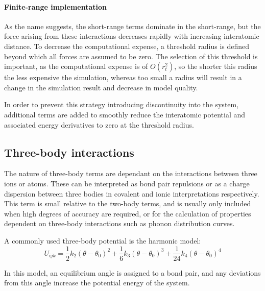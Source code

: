 \vspace{-5pt}
\paragraph{Finite-range implementation}
As the name suggests, the short-range terms dominate in the short-range, but the force arising from these interactions decreases rapidly with increasing interatomic distance.
To decrease the computational expense, a threshold radius is defined beyond which all forces are assumed to be zero.
The selection of this threshold is important, as the computational expense is of $O(r_t^2)$, so the shorter this radius the less expensive the simulation, whereas too small a radius will result in a change in the simulation result and decrease in model quality.

In order to prevent this strategy introducing discontinuity into the system, additional terms are added to smoothly reduce the interatomic potential and associated energy derivatives to zero at the threshold radius. %


\subsection{Three-body interactions}
The nature of three-body terms are dependant on the interactions between three ions or atoms.
These can be interpreted as bond pair repulsions or as a charge dispersion between three bodies in covalent and ionic interpretations respectively.
This term is small relative to the two-body terms, and is usually only included when high degrees of accuracy are required, or for the calculation of properties dependent on three-body interactions such as phonon distribution curves.

A commonly used three-body potential is the harmonic model:
\begin{equation}
  U_{ijk} = \frac{1}{2}k_2(\theta-\theta_0)^2   + \frac{1}{6}k_3(\theta-\theta_0)^3    + \frac{1}{24}k_4(\theta-\theta_0)^4
  \label{eq:threebody}
\end{equation}

In this model, an equilibrium angle is assigned to a bond pair, and any deviations from this angle increase the potential energy of the system.



